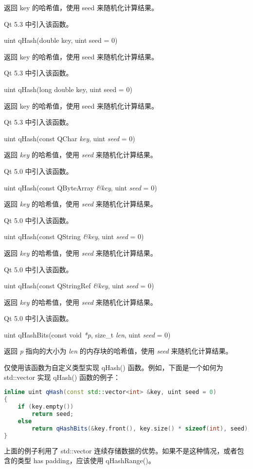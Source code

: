 返回 key 的哈希值，使用 seed 来随机化计算结果。

Qt 5.3 中引入该函数。

uint qHash(double key, uint seed = 0)

返回 key 的哈希值，使用 seed 来随机化计算结果。

Qt 5.3 中引入该函数。

uint qHash(long double key, uint seed = 0)

返回 key 的哈希值，使用 seed 来随机化计算结果。

Qt 5.3 中引入该函数。

uint qHash(const QChar \emph{key}, uint \emph{seed} = 0)

返回 \emph{key} 的哈希值，使用 \emph{seed} 来随机化计算结果。

Qt 5.0 中引入该函数。

uint qHash(const QByteArray \emph{\&key},  uint \emph{seed} = 0)

返回 \emph{key} 的哈希值，使用 \emph{seed} 来随机化计算结果。

Qt 5.0 中引入该函数。

uint qHash(const QString \emph{\&key}, uint \emph{seed} = 0)

返回 \emph{key} 的哈希值，使用 \emph{seed} 来随机化计算结果。

Qt 5.0 中引入该函数。

uint qHash(const QStringRef \emph{\&key}, uint \emph{seed} = 0)

返回 \emph{key} 的哈希值，使用 \emph{seed} 来随机化计算结果。

Qt 5.0 中引入该函数。

uint qHashBits(const void \emph{*p}, size\_t \emph{len}, uint \emph{seed} = 0)

返回 \emph{p} 指向的大小为 \emph{len} 的内存块的哈希值，使用 \emph{seed} 来随机化计算结果。

仅使用该函数为自定义类型实现 qHash() 函数。例如，下面是一个如何为 std::vector 实现 qHash() 函数的例子：


\begin{lstlisting}[language=C++]
inline uint qHash(const std::vector<int> &key, uint seed = 0)
{
    if (key.empty())
        return seed;
    else
        return qHashBits(&key.front(), key.size() * sizeof(int), seed);
}
\end{lstlisting}

上面的例子利用了 std::vector 连续存储数据的优势。如果不是这种情况，或者包含的类型 has padding，应该使用 qHashRange()。

